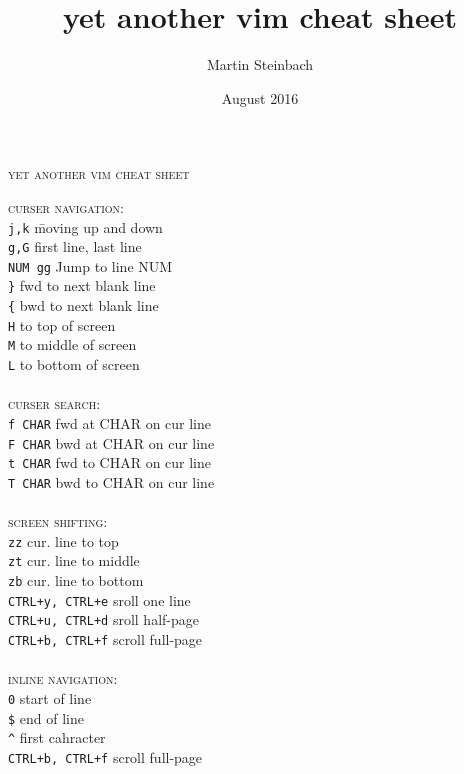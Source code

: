 \documentclass[a4paper,10pt]{scrartcl}
\title{yet another vim cheat sheet}
\author{Martin Steinbach}
\date{August 2016}
\begin{document}
\centering\textsc{\huge{yet another vim cheat sheet}}
\vspace{1cm}


\begin{tabbing}
\large{\textsc{curser navigation:}}\\
\texttt{j,k}		\hspace{2.5 cm}\= moving up and down\\
\texttt{g,G}		\> first line, last line\\
\texttt{NUM gg}		\> Jump to line NUM\\
\texttt{\}}			\> fwd to next blank line\\
\texttt{\{}			\> bwd to next blank line\\
\texttt{H}	\> to top of screen\\
\texttt{M}	\> to middle of screen\\
\texttt{L}	\> to bottom of screen\\\\

\large{\textsc{curser search:}}\\
\texttt{f CHAR} 	\> fwd at CHAR on cur line\\
\texttt{F CHAR} 	\> bwd at CHAR on cur line\\
\texttt{t CHAR} 	\> fwd to CHAR on cur line\\
\texttt{T CHAR} 	\> bwd to CHAR on cur line\\\\

\large{\textsc{screen shifting:}}\\
\texttt{zz}			\> cur. line to top\\
\texttt{zt}			\> cur. line to middle\\
\texttt{zb}			\> cur. line to bottom\\
\texttt{CTRL+y, CTRL+e}		\> sroll one line\\
\texttt{CTRL+u, CTRL+d}		\> sroll half-page\\
\texttt{CTRL+b, CTRL+f}		\> scroll full-page\\\\

\large{\textsc{inline navigation:}}\\
\texttt{0}					\> start of line\\
\texttt{\$}					\> end of line \\
\texttt{\^}					\> first cahracter\\
\texttt{CTRL+b, CTRL+f}		\> scroll full-page\\
\end{tabbing}
\end{document}
